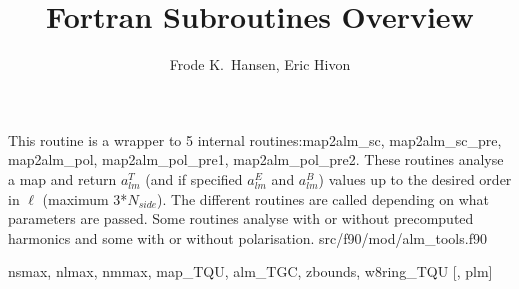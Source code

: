 
\sloppy


\title{\healpix Fortran Subroutines Overview}
 \section[map2alm*]{ }
\label{sub:map2alm}
\author{Frode K.~Hansen, Eric Hivon}

\begin{facility}
{This routine is a wrapper to 5 internal routines:map2alm\_sc,
map2alm\_sc\_pre, map2alm\_pol, map2alm\_pol\_pre1,
map2alm\_pol\_pre2. These routines analyse a  map and return
$a_{lm}^T$ (and if specified $a_{lm}^E$ and $a_{lm}^B$) values up to
the desired order in $\ell$ (maximum 3*$N_{side}$). The different
routines are called depending on what parameters are passed. Some
routines analyse with or without precomputed harmonics and some with
or without polarisation. }
{src/f90/mod/alm\_tools.f90}
\end{facility}

\begin{f90format}
{nsmax, nlmax, nmmax, map\_TQU, alm\_TGC, zbounds, w8ring\_TQU [, plm]}
\end{f90format}


